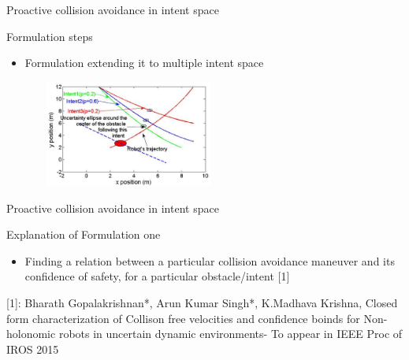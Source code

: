 \documentclass{beamer}
\begin{document}
\begin{frame}{Proactive collision avoidance in intent space}
\begin{block}{Formulation steps}
\begin{itemize}
\item{Formulation extending it to multiple                            intent space}
\end{itemize}
\begin{figure}
\centering
\includegraphics[width= 6.1cm, height=3.5cm]{fig2.eps}
\end{figure}
\end{block}
\end{frame}
\begin{frame}{Proactive collision avoidance in intent space}
\begin{block}{Explanation of Formulation one}
\begin{itemize}
\item{Finding a relation between a particular collision avoidance maneuver and its confidence of safety, for a particular obstacle/intent [1]}


\end{itemize}
[1]: Bharath Gopalakrishnan*, Arun Kumar Singh*, K.Madhava Krishna, Closed form characterization of Collison free velocities and confidence boinds for Non- holonomic robots in uncertain dynamic environments- To appear in IEEE Proc of IROS 2015

\end{block}
\end{frame}
\end{document}
